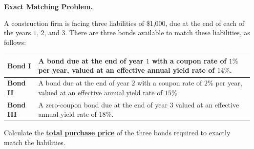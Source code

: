 \documentclass[11pt]{article}
\begin{document}
\begin{center}
    {\Large \textbf{Exact Matching Problem.}}
\end{center}

A construction firm is facing three liabilities of \$1{,}000, due at the end of each of the years $1$, $2$, and $3$.
There are three bonds available to match these liabilities, as follows:

\vspace{0.5em}

\renewcommand{\arraystretch}{1.25}
\begin{center}
\begin{tabular}{>{\bfseries}p{2.2cm} p{12cm}}
\toprule
Bond I & A bond due at the end of year $1$ with a coupon rate of $1\%$ per year, valued at an effective annual yield rate of $14\%$.\\
\midrule
Bond II & A bond due at the end of year $2$ with a coupon rate of $2\%$ per year, valued at an effective annual yield rate of $15\%$.\\
\midrule
Bond III & A zero-coupon bond due at the end of year $3$ valued at an effective annual yield rate of $18\%$.\\
\bottomrule
\end{tabular}
\end{center}

\vspace{0.5em}

Calculate the \underline{\textbf{total purchase price}} of the three bonds required to exactly match the liabilities.
\end{document}
